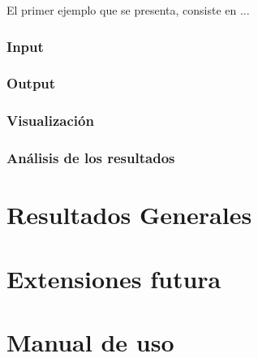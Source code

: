 El primer ejemplo que se presenta, consiste en ...


\subsubsection{Input}

\subsubsection{Output}

\subsubsection{Visualizaci\'on}


\subsubsection{An\'alisis de los resultados}



\section{Resultados Generales}

\section{Extensiones futura}

\section{Manual de uso}

